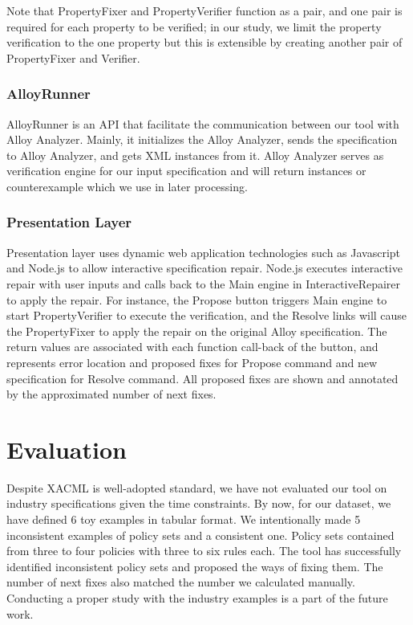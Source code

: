 \documentclass[letterpaper]{acm_proc_article-sp}
\begin{document}
Note that PropertyFixer and PropertyVerifier function as a pair, and one pair is required for each property to be verified; in our study, we limit the property verification to the one property but this is extensible by creating another pair of PropertyFixer and Verifier.

\subsubsection{AlloyRunner}
AlloyRunner is an API that facilitate the communication between our tool with Alloy Analyzer. Mainly, it initializes the Alloy Analyzer, sends the specification to Alloy Analyzer, and gets XML instances from it. Alloy Analyzer serves as verification engine for our input specification and will return instances or counterexample which we use in later processing.

\subsubsection{Presentation Layer}
Presentation layer uses dynamic web application technologies such as Javascript and Node.js to allow interactive specification repair. Node.js executes interactive repair with user inputs and calls back to the Main engine in InteractiveRepairer to apply the repair. For instance, the Propose button triggers Main engine to start PropertyVerifier to execute the verification, and the Resolve links will cause the PropertyFixer to apply the repair on the original Alloy specification. The return values are associated with each function call-back of the button, and represents error location and proposed fixes for Propose command and new specification for Resolve command. All proposed fixes are shown and annotated by the approximated number of next fixes.

\section{Evaluation}

Despite XACML is well-adopted standard, we have not evaluated our tool on industry specifications given the time constraints. By now, for our dataset, we have defined 6 toy examples in tabular format. We intentionally made 5 inconsistent examples of policy sets and a consistent one. Policy sets contained from three to four policies with three to six rules each. The tool has successfully identified inconsistent policy sets and proposed the ways of fixing them. The number of next fixes also matched the number we calculated manually. Conducting a proper study with the industry examples is a part of the future work.
\end{document}
